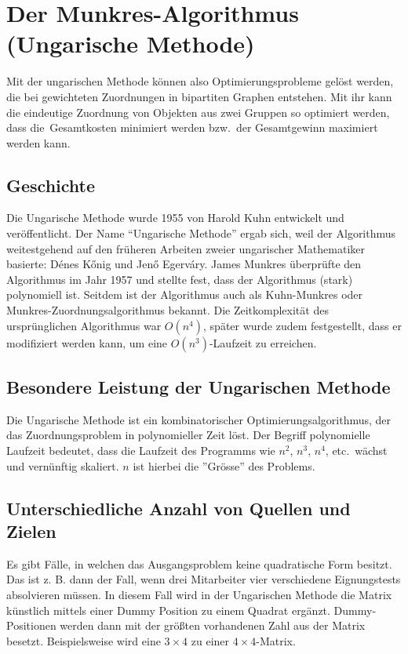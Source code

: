 %
%
%
\section{Der Munkres-Algorithmus (Ungarische Methode)
\label{munkres:section:teil3}}

Mit der ungarischen Methode können also Optimierungsprobleme gelöst
werden, die bei gewichteten Zuordnungen in bipartiten Graphen entstehen.
Mit ihr kann die eindeutige Zuordnung von Objekten aus zwei Gruppen so
optimiert werden, dass die Gesamtkosten minimiert werden bzw.~der
Gesamtgewinn maximiert werden kann.

\subsection{Geschichte
\label{munkres:subsection:malorum}}
Die Ungarische Methode wurde 1955 von Harold Kuhn entwickelt und veröffentlicht.
Der Name ``Ungarische Methode'' ergab sich, weil der Algorithmus
weitestgehend auf den früheren Arbeiten zweier ungarischer Mathematiker
basierte: Dénes Kőnig und Jenő Egerváry.
James Munkres überprüfte den Algorithmus im Jahr 1957 und stellte fest,
dass der Algorithmus (stark) polynomiell ist.
Seitdem ist der Algorithmus auch als Kuhn-Munkres oder
Munkres-Zuordnungsalgorithmus bekannt.
Die Zeitkomplexität des ursprünglichen Algorithmus war $O(n^4)$,
später wurde zudem festgestellt, dass er modifiziert werden kann,
um eine  $O(n^3)$-Laufzeit zu erreichen.

\subsection{Besondere Leistung der Ungarischen Methode
\label{munkres:subsection:malorum}}
Die Ungarische Methode ist ein kombinatorischer Optimierungsalgorithmus, der das Zuordnungsproblem
in polynomieller Zeit löst.
Der Begriff polynomielle Laufzeit bedeutet, dass die Laufzeit des Programms
wie $n^2$, $n^3$, $n^4$, etc.~wächst und vernünftig skaliert. $n$ ist hierbei die ''Grösse'' des Problems.

\subsection{Unterschiedliche Anzahl von Quellen und Zielen
\label{munkres:subsection:malorum}}
Es gibt Fälle, in welchen das Ausgangsproblem keine quadratische Form besitzt. Das ist z. B. dann der Fall, wenn drei Mitarbeiter vier verschiedene Eignungstests absolvieren müssen. In diesem Fall wird in der Ungarischen Methode die Matrix künstlich mittels einer Dummy Position zu einem Quadrat ergänzt. Dummy-Positionen werden dann mit der größten vorhandenen Zahl aus der Matrix besetzt. Beispielsweise wird eine $3\times 4$ zu einer $4\times 4$-Matrix.


